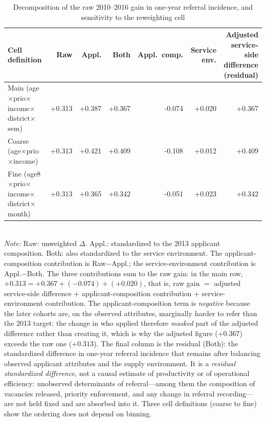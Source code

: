 \begin{table}[htbp]\centering
\caption{Decomposition of the raw 2010--2016 gain in one-year referral incidence, and sensitivity to the reweighting cell}
\label{tab:P3decomp}
\footnotesize
\setlength{\tabcolsep}{4pt}
\begin{tabular}{lrrrrrr}
\toprule
Cell definition & Raw & Appl. & Both & Appl.\ comp. & Service env. & \shortstack[r]{Adjusted\\service-side\\difference\\(residual)} \\
\midrule
Main (age$\times$prio$\times$income$\times$district$\times$sem) & +0.313 & +0.387 & +0.367 & -0.074 & +0.020 & +0.367 \\
Coarse (age$\times$prio$\times$income) & +0.313 & +0.421 & +0.409 & -0.108 & +0.012 & +0.409 \\
Fine (age8$\times$prio$\times$income$\times$district$\times$month) & +0.313 & +0.365 & +0.342 & -0.051 & +0.023 & +0.342 \\
\bottomrule
\end{tabular}
\\[3pt]{\footnotesize \textit{Note:} Raw: unweighted $\Delta$. Appl.: standardized to the 2013 applicant composition. Both: also standardized to the service environment. The applicant-composition contribution is Raw$-$Appl.; the service-environment contribution is Appl.$-$Both. The three contributions sum to the raw gain: in the main row, $+0.313 = +0.367 + (-0.074) + (+0.020)$, that is, raw gain $=$ adjusted service-side difference $+$ applicant-composition contribution $+$ service-environment contribution. The applicant-composition term is \emph{negative} because the later cohorts are, on the observed attributes, marginally harder to refer than the 2013 target: the change in who applied therefore \emph{masked} part of the adjusted difference rather than creating it, which is why the adjusted figure ($+0.367$) exceeds the raw one ($+0.313$). The final column is the residual (Both): the standardized difference in one-year referral incidence that remains after balancing observed applicant attributes and the supply environment. It is a \emph{residual standardized difference}, not a causal estimate of productivity or of operational efficiency: unobserved determinants of referral---among them the composition of vacancies released, priority enforcement, and any change in referral recording---are not held fixed and are absorbed into it. Three cell definitions (coarse to fine) show the ordering does not depend on binning.}
\end{table}
